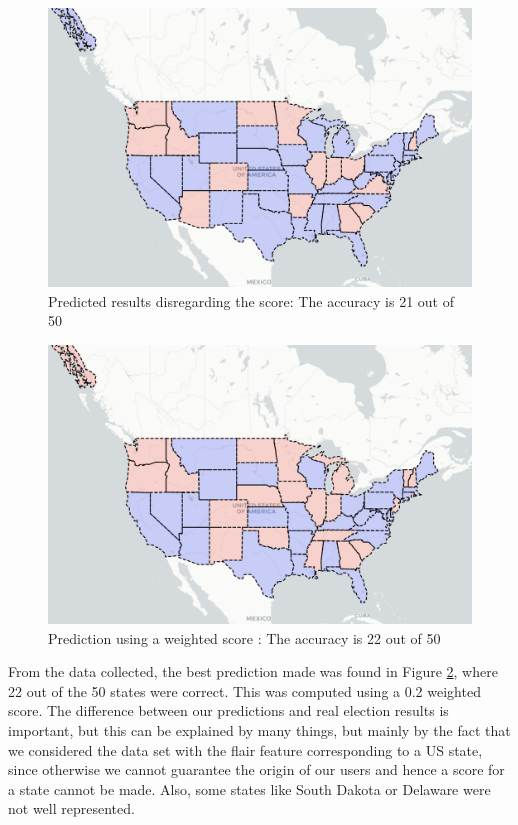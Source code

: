 \documentclass[11pt]{article}
\begin{document}
\begin{figure}[!h]
\centering\includegraphics[scale=0.15]{Images/disregarding_scores.png}
\caption{Predicted results disregarding the score: The accuracy is 21 out of 50}
\label{US_prediction}
\end{figure}

\begin{figure}[!h]
\centering\includegraphics[scale=0.15]{Images/weighted_scores.png}
\caption{Prediction using a weighted score : The accuracy is 22 out of 50}
\label{US_prediction_weighted}
\end{figure}

From the data collected, the best prediction made was found in Figure \ref{US_prediction_weighted}, where 22 out of the 50 states were correct. This was computed using a 0.2 weighted score. 
The difference between our predictions and real election results is important, but this can be explained by many things, but mainly by the fact that we considered the data set with the flair feature corresponding to a US state, since otherwise we cannot guarantee the origin of our users and hence a score for a state cannot be made. Also, some states like South Dakota or Delaware were not well represented.
\end{document}
